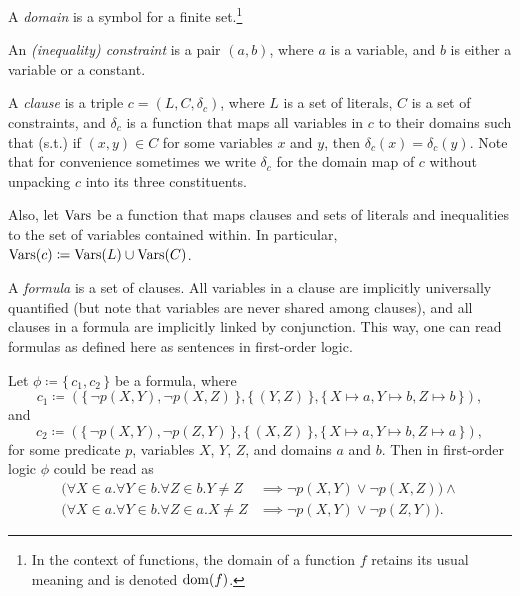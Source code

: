 \begin{definition}
  A \emph{domain} is a symbol for a finite set.\footnote{In the context of
    functions, the domain of a function $f$ retains its usual meaning and is
    denoted $\operatorname{dom}(f)$.}
\end{definition}

\begin{definition}
  An \emph{(inequality) constraint} is a pair $(a, b)$, where $a$ is a variable,
  and $b$ is either a variable or a constant.
\end{definition}

\begin{definition}
  A \emph{clause} is a triple $c = (L, C, \delta_c)$, where $L$ is a set of
  literals, $C$ is a set of constraints, and $\delta_c$ is a function that maps
  all variables in $c$ to their domains such that (s.t.) if $(x, y) \in C$ for
  some variables $x$ and $y$, then $\delta_c(x) = \delta_c(y)$. Note that for
  convenience sometimes we write $\delta_c$ for the domain map of $c$ without
  unpacking $c$ into its three constituents.

  Also, let $\operatorname{Vars}$ be a function that maps clauses and sets of literals and
  inequalities to the set of variables contained within. In particular,
  $\operatorname{Vars}(c) \coloneqq \operatorname{Vars}(L) \cup \operatorname{Vars}(C)$.
\end{definition}

A \emph{formula} is a set of clauses. All variables in a clause are implicitly
universally quantified (but note that variables are never shared among clauses),
and all clauses in a formula are implicitly linked by conjunction. This way, one
can read formulas as defined here as sentences in first-order logic.

\begin{example} \label{example:first} Let $\phi \coloneqq \{\, c_1, c_2 \,\}$ be
  a formula, where
  \[
    c_1 \coloneqq (\{\, \neg p(X, Y), \neg p(X, Z) \,\}, \{\, (Y, Z) \,\}, \{\, X \mapsto a, Y \mapsto b, Z \mapsto b \,\}),
  \]
  and
  \[
    c_2 \coloneqq (\{\, \neg p(X, Y), \neg p(Z, Y) \,\}, \{\, (X, Z) \,\}, \{\, X \mapsto a, Y \mapsto b, Z \mapsto a \,\}),
  \]
  for some predicate $p$, variables $X$, $Y$, $Z$, and domains $a$ and $b$. Then
  in first-order logic $\phi$ could be read as
  \begin{align*}
    (\forall X \in a. \forall Y \in b. \forall Z \in b. Y \ne Z &\implies \neg p(X, Y) \lor \neg p(X, Z)) \land \\
    (\forall X \in a. \forall Y \in b. \forall Z \in a. X \ne Z &\implies \neg p(X, Y) \lor \neg p(Z, Y)).
  \end{align*}
\end{example}

